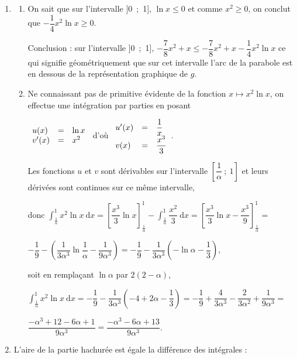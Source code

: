 \documentclass[10pt]{article}
\begin{document}
\begin{enumerate}
\item 
	\begin{enumerate}
		\item On sait que sur l'intervalle ]0~;~1], $\ln x \leqslant  0$ et comme $x^2 \geqslant 0$, on conclut que $- \dfrac14 x^2 \ln x \geqslant 0$.

Conclusion : sur l'intervalle ]0~;~1], $- \dfrac78 x^2 + x \leqslant - \dfrac78 x^2 + x - \dfrac14 x^2 \ln x$ ce qui signifie géométriquement que sur cet intervalle l'arc de la parabole est en dessous de la représentation graphique de $g$.
		\item Ne connaissant pas de primitive évidente de la fonction $x \longmapsto x^2 \ln x$, on effectue une intégration par parties en posant 
		
$\begin{array}{l c l}
u(x)&=&\ln x\\
v'(x)&=&x^2
\end{array}$ d'où $\begin{array}{l c l}
u'(x)&=&\dfrac 1x\\
v(x)&=&\dfrac{x^3}{3}
\end{array}$.

Les fonctions $u$ et $v$ sont dérivables sur l'intervalle $\left[\dfrac{1}{\alpha}~;~1\right]$ et leurs dérivées sont continues sur ce même intervalle,

donc $\displaystyle\int_{\frac{1}{\alpha}}^1 x^2 \ln x\:\text{d}x = \left[\dfrac{x^3}{3}\ln x \right]_{\frac{1}{\alpha}}^1 - \displaystyle\int_{\frac{1}{\alpha}}^1 \dfrac{x^2}{3}\:\text{d}x = \left[\dfrac{x^3}{3}\ln x - \dfrac{x^3}{9}\right]_{\frac{1}{\alpha}}^1 =$

$- \dfrac19 - \left(\dfrac{1}{3\alpha^3}\ln \dfrac{1}{\alpha} - \dfrac{1}{9\alpha^3} \right) = - \dfrac19 - \dfrac{1}{3\alpha^3}\left(- \ln \alpha - \dfrac13 \right)$, 

soit en remplaçant $\ln \alpha$ par $2(2 - \alpha)$,

$\displaystyle\int_{\frac{1}{\alpha}}^1 x^2 \ln x\:\text{d}x = - \dfrac19 - \dfrac{1}{3\alpha^3}\left(- 4 + 2\alpha - \dfrac13\right) = - \dfrac19 + \dfrac{4}{3\alpha^3} - \dfrac{2}{3\alpha^2} + \dfrac{1}{9\alpha^3} =$

$ \dfrac{- \alpha^3 + 12 - 6\alpha + 1}{9\alpha^3} = \dfrac{- \alpha^3 - 6\alpha + 13}{9\alpha^3}$.
	\end{enumerate}
\item L'aire de la partie hachurée est égale la différence des intégrales :


\end{enumerate}
\end{document}
